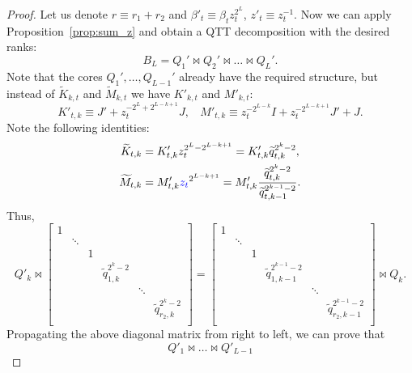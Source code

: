 \documentclass[a4paper]{article}
\newcommand{\LL}{L}
\newcommand{\KKother}{\widetilde{K}}
\newcommand{\MMother}{\widetilde{M}}
\newcommand{\bbeta}{\beta'}
\newcommand{\ww}{z'}
\newcommand{\qq}{\widetilde{q}}
\begin{document}
\begin{proof}
Let us denote $r \equiv r_1 + r_2$ and $\bbeta_t \equiv \beta_t z_t^{2^\LL}$, $\ww_t \equiv z_t^{-1}$.
Now we can apply Proposition~\ref{prop:sum_z} and obtain a QTT decomposition with the desired ranks:
\[
B_L = Q_1' \Join Q_2' \Join \dots \Join Q_L'.
\]
Note that the cores $Q_1', \dots, Q_{\LL-1}'$ already have the required structure, but instead of $\KKother_{k,t}$ and $\MMother_{k, t}$ we have $K'_{k,t}$ and $M'_{k,t}$:
\[
K'_{t,k} \equiv J' + z_t^{-2^\LL + 2^{\LL-k+1}}J,~~~~
M'_{t,k} \equiv z_t^{-2^{\LL-k}} I + z_t^{-2^{\LL-k+1}} J'  + J.
\]
Note the following identities: 
\begin{align*}
    \KKother_{t,k} &= K'_{t,k}z_t^{2^\LL - 2^{\LL-k+1}} = K'_{t,k}\qq_{t,k}^{2^k-2}, \\
    \MMother_{t,k} &= M'_{t,k}\textcolor{blue}{z_t}^{2^{\LL-k+1}} = M'_{t,k}\frac{\qq_{t,k}^{2^k-2}}{\qq_{t,k-1}^{2^{k-1}-2}}.
\end{align*}
Thus,
\[
Q'_{k}
\Join
\begin{bmatrix}
    1 &        &   &                         &        & \\
      & \ddots &   &                         &        & \\
      &        & 1 &                         &        & \\
      &        &   & \qq_{1,k}^{2^k-2}               &        & \\
      &        &   &                         & \ddots & \\
      &        &   &                         &        & \qq_{r_2,k}^{2^k-2} \\
\end{bmatrix}
=
\begin{bmatrix}
    1 &        &   &                         &        & \\
      & \ddots &   &                         &        & \\
      &        & 1 &                         &        & \\
      &        &   & \qq_{1,k-1}^{2^{k-1}-2}             &        & \\
      &        &   &                         & \ddots & \\
      &        &   &                         &        & \qq_{r_2,k-1}^{2^{k-1}-2} \\
\end{bmatrix}
\Join
Q_k.
\]
Propagating the above diagonal matrix from right to left, we can prove that
\[
Q'_1\Join \dots \Join Q'_{\LL-1}
\]
\end{proof}
\end{document}
